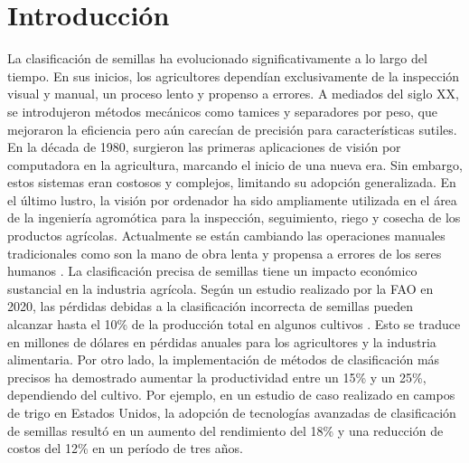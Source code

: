\section{Introducción}
La clasificación de semillas ha evolucionado significativamente a lo largo del tiempo. En sus inicios, los agricultores dependían exclusivamente de la inspección visual y manual, un proceso lento y propenso a errores. A mediados del siglo XX, se introdujeron métodos mecánicos como tamices y separadores por peso, que mejoraron la eficiencia pero aún carecían de precisión para características sutiles. En la década de 1980, surgieron las primeras aplicaciones de visión por computadora en la agricultura, marcando el inicio de una nueva era. Sin embargo, estos sistemas eran costosos y complejos, limitando su adopción generalizada. 
En el último lustro, la visión por ordenador ha sido ampliamente utilizada en el área de la ingeniería agromótica para la inspección, seguimiento, riego y cosecha de los productos agrícolas. Actualmente se están cambiando las operaciones manuales tradicionales como son la mano de obra lenta y propensa a errores de los seres humanos \cite{hernandez2016comparacion}. La clasificación precisa de semillas tiene un impacto económico sustancial en la industria agrícola. Según un estudio realizado por la FAO en 2020, las pérdidas debidas a la clasificación incorrecta de semillas pueden alcanzar hasta el 10\% de la producción total en algunos cultivos \cite{mensah2021adoption}. Esto se traduce en millones de dólares en pérdidas anuales para los agricultores y la industria alimentaria. Por otro lado, la implementación de métodos de clasificación más precisos ha demostrado aumentar la productividad entre un 15\% y un 25\%, dependiendo del cultivo. Por ejemplo, en un estudio de caso realizado en campos de trigo en Estados Unidos, la adopción de tecnologías avanzadas de clasificación de semillas resultó en un aumento del rendimiento del 18\% y una reducción de costos del 12\% en un período de tres años. 



